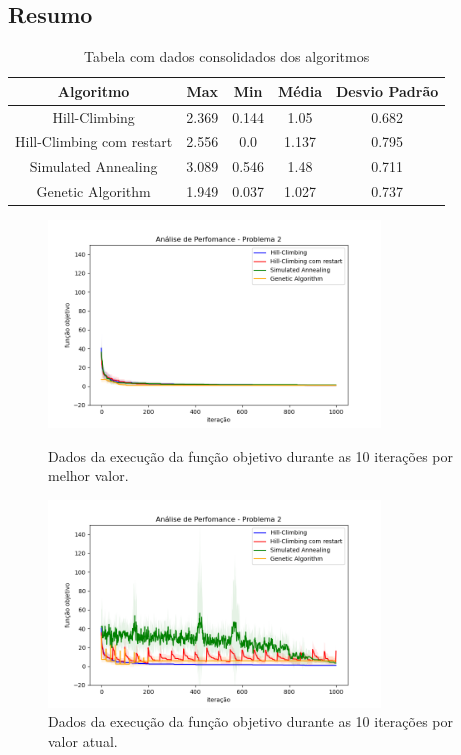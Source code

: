 \subsection{Resumo}

\begin{table}[h!]
\centering
\begin{tabular}{ |c|c|c|c|c|  }
\hline
\rowcolor{lightgray}
Algoritmo & Max & Min & Média & Desvio Padrão \\
\hline
Hill-Climbing & 2.369 & 0.144 & 1.05 & 0.682 \\
\hline
Hill-Climbing com restart & 2.556 & 0.0 & 1.137 & 0.795 \\
\hline
Simulated Annealing & 3.089 & 0.546 & 1.48 & 0.711 \\
\hline
Genetic Algorithm & 1.949 & 0.037 & 1.027 & 0.737 \\
\hline

\end{tabular}
\caption{Tabela com dados consolidados dos algoritmos}
\end{table}

\begin{figure}[H]
\centering
  \begin{minipage}[b]{0.48\textwidth}
    \includegraphics[width=88mm]{imagens/otima/problema-2-performance-algoritmos-best.png}
    \caption{Dados da execução da função objetivo durante as 10 iterações por melhor valor.
    \label{fig:problema-2-performance-algoritmos-best}}
  \end{minipage}
  \hfill
  \begin{minipage}[b]{0.48\textwidth}
    \includegraphics[width=88mm]{imagens/otima/problema-2-performance-algoritmos-value.png}
    \caption{Dados da execução da função objetivo durante as 10 iterações por valor atual.
    \label{fig:problema-2-performance-algoritmos-value}}
  \end{minipage}
\end{figure}